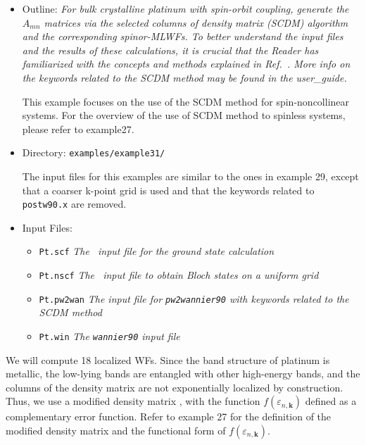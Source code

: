 \documentclass[a4paper,11pt,twoside]{article}
\begin{document}
\begin{itemize}
\item Outline: {\it For bulk crystalline platinum with spin-orbit coupling, generate the $A_{mn}$ matrices via the selected columns of density matrix (SCDM) algorithm and the corresponding spinor-MLWFs. To better understand the input files and the results of these calculations, it is crucial that the Reader has familiarized with the concepts and methods explained in Ref.~\cite{LinLin-ArXiv2017}. More info on the keywords related to the SCDM method may be found in the user\_guide.} 

This example focuses on the use of the SCDM method for spin-noncollinear systems. For the overview of the use of SCDM method to spinless systems, please refer to example27.
\item Directory: {\tt examples/example31/} 

The input files for this examples are similar to the ones in example 29, except that a coarser k-point grid is used and that the keywords related to {\tt postw90.x} are removed.
\item Input Files: 
\begin{itemize}
\item {\tt Pt.scf}  {\it The \pwscf\ input file for the ground state calculation} 
\item {\tt Pt.nscf}  {\it The \pwscf\ input file to obtain Bloch states on a uniform grid}
\item {\tt Pt.pw2wan}  {\it The input file for {\tt pw2wannier90} with keywords related to the SCDM method}
\item {\tt Pt.win}  {\it The {\tt wannier90} input file}
\end{itemize}
\end{itemize}


We will compute 18 localized WFs. Since the band structure of platinum is metallic, the low-lying bands are entangled with other high-energy bands, and the columns of the density matrix are not exponentially localized by construction.
Thus, we use a modified density matrix \cite{LinLin-ArXiv2017}, with the function $f(\varepsilon_{n,\mathbf{k}})$ defined as a complementary error function. Refer to example 27 for the definition of the modified density matrix and the functional form of $f(\varepsilon_{n,\mathbf{k}})$.
\end{document}
